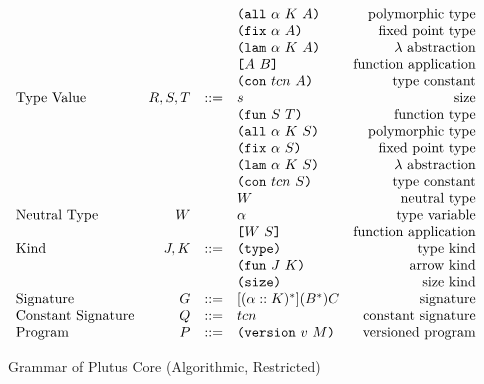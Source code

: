 \documentclass[../plutus-core-specification.tex]{subfiles}
\begin{document}
\begin{figure*}[t]
\[\begin{array}{lrclr}
                                  &        &     & \texttt{(} \texttt{all} ~ \alpha ~ K ~ A \texttt{)}        & \textrm{polymorphic type}\\
                                  &        &     & \texttt{(} \texttt{fix} ~ \alpha ~ A \texttt{)}           & \textrm{fixed point type}\\
                                  &        &     & \texttt{(} \texttt{lam} ~ \alpha ~ K ~ A \texttt{)}        & \textrm{$\lambda$ abstraction}\\
                                  &        &     & \texttt{[} A ~ B \texttt{]}                & \textrm{function application}\\
                                  &        &     & \texttt{(} \texttt{con} ~ tcn ~ A \texttt{)}          & \textrm{type constant}\\
        \textrm{Type Value}       & R,S,T  & ::= & s                          & \textrm{size}\\
                                  &        &     & \texttt{(} \texttt{fun} ~ S ~ T \texttt{)}                & \textrm{function type}\\
                                  &        &     & \texttt{(} \texttt{all} ~ \alpha ~ K ~ S \texttt{)}        & \textrm{polymorphic type}\\
                                  &        &     & \texttt{(} \texttt{fix} ~ \alpha ~ S \texttt{)}           & \textrm{fixed point type}\\
                                  &        &     & \texttt{(} \texttt{lam} ~ \alpha ~ K ~ S \texttt{)}        & \textrm{$\lambda$ abstraction}\\
                                  &        &     & \texttt{(} \texttt{con} ~ tcn ~ S \texttt{)}          & \textrm{type constant}\\
                                  &        &     & W                          & \textrm{neutral type}\\
        \textrm{Neutral Type}     & W      &     & \alpha                     & \textrm{type variable}\\
                                  &        &     & \texttt{[} W ~ S \texttt{]}                & \textrm{function application}\\
        \textrm{Kind}             & J,K    & ::= & \texttt{(} \texttt{type} \texttt{)}{}                   & \textrm{type kind}\\
                                  &        &     & \texttt{(} \texttt{fun} ~ J ~ K \texttt{)}                & \textrm{arrow kind}\\
                                  &        &     & \texttt{(} \texttt{size} \texttt{)}{}                   & \textrm{size kind}\\
        \textrm{Signature}        & G      & ::= & [(\alpha :: K)^*](B^*)C     & \textrm{signature}\\
        \textrm{Constant Signature}   & Q      & ::= & tcn                        & \textrm{constant signature}\\
        \textrm{Program}          & P      & ::= & \texttt{(} \texttt{version} ~ v ~ M \texttt{)}             & \textrm{versioned program}\\

    \end{array}\]
    \caption{Grammar of Plutus Core (Algorithmic, Restricted)}
    \label{fig:Plutus_core_grammar_algorithmic_restricted}
\end{figure*}
\end{document}
